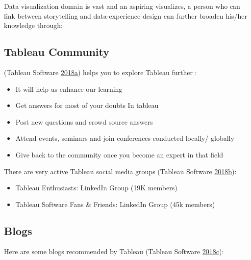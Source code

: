 \documentclass[]{book}
\providecommand{\tightlist}{%
  \setlength{\itemsep}{0pt}\setlength{\parskip}{0pt}}
\begin{document}
Data visualization domain is vast and an aspiring visualizes, a person who can link between storytelling and data-experience design can further broaden his/her knowledge through:

\hypertarget{tableau-community}{%
\subsection{Tableau Community}\label{tableau-community}}

(Tableau Software \protect\hyperlink{ref-Tableau_Community}{2018}\protect\hyperlink{ref-Tableau_Community}{a}) helps you to explore Tableau further :

\begin{itemize}
\tightlist
\item
  It will help us enhance our learning
\item
  Get answers for most of your doubts In tableau
\item
  Post new questions and crowd source answers
\item
  Attend events, seminars and join conferences conducted locally/ globally
\item
  Give back to the community once you become an expert in that field
\end{itemize}

There are very active Tableau social media groups (Tableau Software \protect\hyperlink{ref-LinkedIn_Groups}{2018}\protect\hyperlink{ref-LinkedIn_Groups}{b}):

\begin{itemize}
\tightlist
\item
  Tableau Enthusiasts: LinkedIn Group (19K members)
\item
  Tableau Software Fans \& Friends: LinkedIn Group (45k members)
\end{itemize}

\hypertarget{blogs}{%
\subsection{Blogs}\label{blogs}}

Here are some blogs recommended by Tableau (Tableau Software \protect\hyperlink{ref-Top_10_Blogs}{2018}\protect\hyperlink{ref-Top_10_Blogs}{c}):
\end{document}
